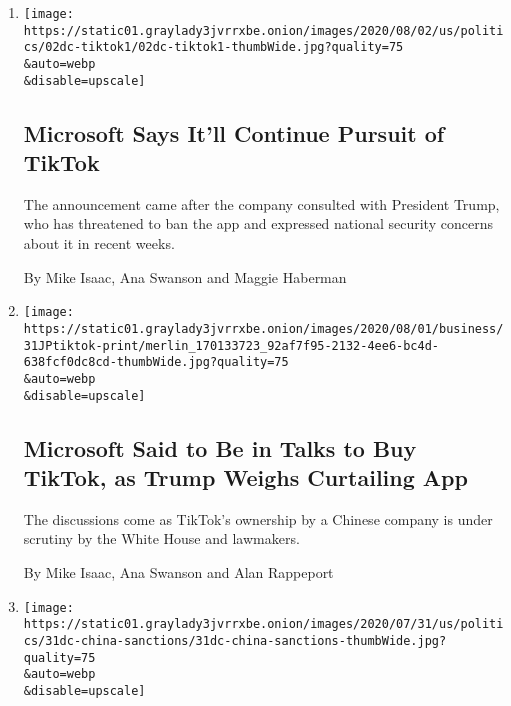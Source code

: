 \begin{enumerate}
\def\labelenumi{\arabic{enumi}.}
\item
  \href{/2020/08/02/business/economy/trump-tiktok-china-national-security.html}{}

  \texttt{[image: https://static01.graylady3jvrrxbe.onion/images/2020/08/02/us/politics/02dc-tiktok1/02dc-tiktok1-thumbWide.jpg?quality=75\\\&auto=webp\\\&disable=upscale]}

  \hypertarget{microsoft-says-itll-continue-pursuit-of-tiktok}{%
  \subsection{Microsoft Says It'll Continue Pursuit of
  TikTok}\label{microsoft-says-itll-continue-pursuit-of-tiktok}}

  The announcement came after the company consulted with President
  Trump, who has threatened to ban the app and expressed national
  security concerns about it in recent weeks.

  By Mike Isaac, Ana Swanson and Maggie Haberman
\item
  \href{/2020/07/31/technology/tiktok-microsoft.html}{}

  \texttt{[image: https://static01.graylady3jvrrxbe.onion/images/2020/08/01/business/31JPtiktok-print/merlin\_170133723\_92af7f95-2132-4ee6-bc4d-638fcf0dc8cd-thumbWide.jpg?quality=75\\\&auto=webp\\\&disable=upscale]}

  \hypertarget{microsoft-said-to-be-in-talks-to-buy-tiktok-as-trump-weighs-curtailing-app}{%
  \subsection{Microsoft Said to Be in Talks to Buy TikTok, as Trump
  Weighs Curtailing
  App}\label{microsoft-said-to-be-in-talks-to-buy-tiktok-as-trump-weighs-curtailing-app}}

  The discussions come as TikTok's ownership by a Chinese company is
  under scrutiny by the White House and lawmakers.

  By Mike Isaac, Ana Swanson and Alan Rappeport
\item
  \href{/2020/07/31/us/politics/sanctions-china-xinjiang-uighurs.html}{}

  \texttt{[image: https://static01.graylady3jvrrxbe.onion/images/2020/07/31/us/politics/31dc-china-sanctions/31dc-china-sanctions-thumbWide.jpg?quality=75\\\&auto=webp\\\&disable=upscale]}

  \hypertarget{us-adds-sanctions-over-internment-of-muslims-in-china}{%
}
\end{enumerate}
